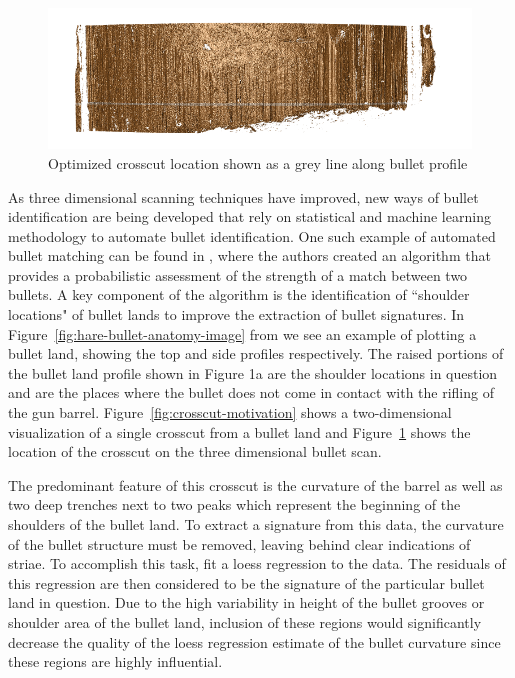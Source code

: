 \documentclass[12pt]{article}\usepackage[]{graphicx}\usepackage[]{color}
\makeatletter
\def\maxwidth{ %
  \ifdim\Gin@nat@width>\linewidth
    \linewidth
  \else
    \Gin@nat@width
  \fi
}
\newenvironment{knitrout}{}{} %
\theoremstyle{nonumberplain}
\newcommand{\hh}[1]{{\color{orange}{#1}}}
\makeatother
\begin{document}
\begin{knitrout}
\color{fgcolor}\begin{figure}

{\centering \includegraphics[width=\maxwidth]{../images/crosscut-location-example} 

}

\caption[Optimized crosscut location shown as a grey line along bullet profile]{Optimized crosscut location shown as a grey line along bullet profile}\label{fig:crosscut-location-example}
\end{figure}


\end{knitrout}

As three dimensional scanning techniques have improved, new ways of bullet identification are being developed that rely on  statistical and machine learning methodology to automate bullet identification. One such example of automated bullet matching can be found in \cite{hare2017}, where the authors created an algorithm  that provides a probabilistic assessment of the strength of a match between two bullets. A key component of the algorithm  is the identification of ``shoulder locations" of bullet lands to improve the extraction of bullet signatures. In Figure~\ref{fig:hare-bullet-anatomy-image} from \cite{hare2017} we see an example of plotting a bullet land, showing the top and side profiles respectively. The raised portions of the bullet land profile shown in Figure 1a are the shoulder locations in question and are the places where the bullet does not come in contact with the rifling of the gun barrel.  \hh{XXX start by showing a rendering of an x3p scan.}
Figure~\ref{fig:crosscut-motivation} shows a two-dimensional visualization of a single crosscut from a bullet land and Figure~\ref{fig:crosscut-location-example} shows the location of the crosscut on the three dimensional bullet scan. 


The predominant feature of this crosscut is the curvature of the barrel as well as two deep trenches next to two peaks which represent the beginning of the shoulders of the bullet land. To extract a signature from this data, the curvature of the bullet structure must be removed, leaving behind clear indications of striae. To accomplish this task, \cite{hare2017} fit a loess regression to the data. The residuals of this regression are then considered to be the signature of the particular bullet land in question. Due to the high variability in height of the bullet grooves or shoulder area of the bullet land, inclusion of these regions would significantly decrease the quality of the loess regression estimate of the bullet curvature since these regions are highly influential. 
\end{document}
